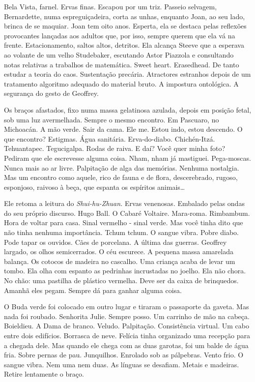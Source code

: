 Bela Vista, farnel. Ervas finas. Escapou por um triz. Passeio selvagem,
Bernardette, numa espreguiçadeira, corta as unhas, enquanto Joan, ao seu
lado, brinca de se maquiar. Joan tem oito anos. Esperta, ela se destaca
pelas reflexões provocantes lançadas aos adultos que, por isso, sempre
querem que ela vá na frente. Estacionamento, saltos altos, detritos. Ela
alcança Steeve que a esperava ao volante de um velho Studebaker,
escutando Astor Piazzola e consultando notas relativas a trabalhos de
matemática. Sweet heart. Erasedhead. De tanto estudar a teoria do caos.
Sustentação precária. Atractores estranhos depois de um tratamento
algoritmo adequado do material bruto. A impostura ontológica. A
segurança do gesto de Geoffrey.

Os braços afastados, fixo numa massa gelatinosa azulada, depois em
posição fetal, sob uma luz avermelhada. Sempre o mesmo encontro. Em
Pascuaro, no Michoacán. A mão verde. Sair da cama. Ele me. Estou indo,
estou descendo. O que encontro? Estigmas. Água sanitária. Erva-do-diabo.
Chichén-Itzá. Tehuantapec. Tegucigalpa. Rodas de raiva. E daí? Você quer
minha foto? Pediram que ele escrevesse alguma coisa. Nham, nham já
mastiguei. Pega-moscas. Nunca mais ao ar livre. Palpitação de alga das
memórias. Nenhuma nostalgia. Mas um encontro como aquele, rico de fauna
e de flora, descerebrado, rugoso, esponjoso, raivoso à beça, que espanta
os espíritos animais\ldots{}

Ele retoma a leitura do \emph{Shui-hu-Zhuan.} Ervas venenosas. Embalado
pelas ondas do seu próprio discurso. Hugo Ball. O Cabaré Voltaire.
Mara-roma. Rimbambum. Hora de voltar para casa. Sinal vermelho - sinal
verde. Mas você tinha dito que não tinha nenhuma importância. Tchum
tchum. O sangue vibra. Pobre diabo. Pode tapar os ouvidos. Cães de
porcelana. A última das guerras. Geoffrey largado, os olhos
semicerrados. O céu escurece. A pequena massa amarelada balança. Os
cotocos de madeira no cascalho. Uma criança acaba de levar um tombo. Ela
olha com espanto as pedrinhas incrustadas no joelho. Ela não chora. No
chão: uma pastilha de plástico vermelha. Deve ser da caixa de
brinquedos. Amanhã eles pegam. Sempre dá para ganhar alguma coisa.

O Buda verde foi colocado em outro lugar e tiraram o passaporte da
gaveta. Mas nada foi roubado. Senhorita Julie. Sempre posso. Um carrinho
de mão na cabeça. Boieldieu. A Dama de branco. Veludo. Palpitação.
Consistência virtual. Um cabo entre dois edifícios. Borrasca de neve.
Felícia tinha organizado uma recepção para a chegada dele. Mas quando
ele chega com as duas garotas, foi um balde de água fria. Sobre pernas
de pau. Junquilhos. Enrolado sob as pálpebras. Vento frio. O sangue
vibra. Nem uma nem duas. As línguas se desafiam. Metais e madeiras.
Retire lentamente o braço.

